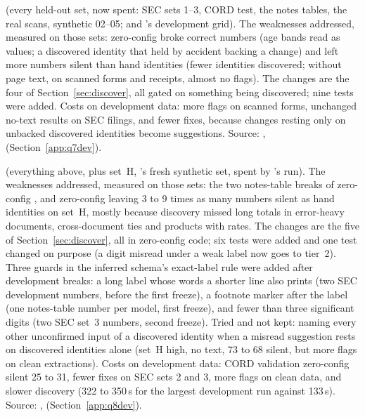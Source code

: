 \textbf{} (every  held-out set, now spent: SEC sets 1--3, CORD test, the notes tables, the real scans, synthetic 02--05; and 's development grid). The weaknesses addressed, measured on those sets: zero-config broke correct numbers (age bands read as values; a discovered identity that held by accident backing a change) and left more numbers silent than hand identities (fewer identities discovered; without page text, on scanned forms and receipts, almost no flags). The changes are the four of Section~\ref{sec:discover}, all gated on something being discovered; nine tests were added. Costs on development data: more flags on scanned forms, unchanged no-text results on SEC filings, and fewer fixes, because changes resting only on unbacked discovered identities become suggestions. Source: ,  (Section~\ref{app:q7dev}).

\textbf{} (everything above, plus set~H, 's fresh synthetic set, spent by 's run). The weaknesses addressed, measured on those sets: the two notes-table breaks of zero-config , and zero-config leaving 3 to 9 times as many numbers silent as hand identities on set~H, mostly because discovery missed long totals in error-heavy documents, cross-document ties and products with rates. The changes are the five of Section~\ref{sec:discover}, all in zero-config code; six tests were added and one  test changed on purpose (a digit misread under a weak label now goes to tier~2). Three guards in the inferred schema's exact-label rule were added after development breaks: a long label whose words a shorter line also prints (two SEC development numbers, before the first freeze), a footnote marker after the label (one notes-table number per model, first freeze), and fewer than three significant digits (two SEC set~3 numbers, second freeze). Tried and not kept: naming every other unconfirmed input of a discovered identity when a misread suggestion rests on discovered identities alone (set~H high, no text, 73 to 68 silent, but more flags on clean extractions). Costs on development data: CORD validation zero-config silent 25 to 31, fewer fixes on SEC sets 2 and 3, more flags on clean data, and slower discovery (322 to 350\,s for the largest development run against 133\,s). Source: ,  (Section~\ref{app:q8dev}).

